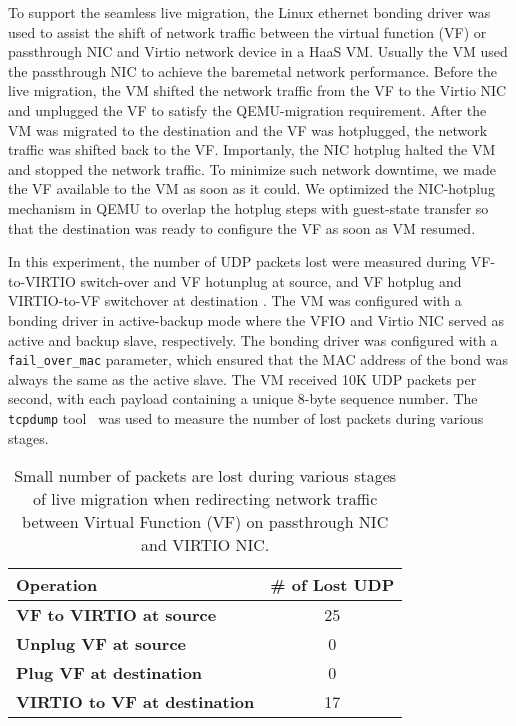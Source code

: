 

To support the seamless live migration, the Linux ethernet
bonding driver was used to assist the shift of network traffic
between the virtual function (VF) or passthrough NIC and
Virtio network device in a HaaS VM. Usually the VM used the
passthrough NIC to achieve the baremetal network performance.
Before the live migration, the VM shifted the network traffic
from the VF to the Virtio NIC and unplugged the VF to satisfy
the QEMU-migration requirement. After the VM was migrated to
the destination and the VF was hotplugged, the network traffic
was shifted back to the VF. Importanly, the NIC hotplug halted
the VM and stopped the network traffic. To minimize such
network downtime, we made the VF available to the VM as soon
as it could. We optimized the NIC-hotplug mechanism in QEMU
to overlap the hotplug steps with
guest-state transfer so that the destination was ready to
configure the VF as soon as VM resumed.

In this experiment, the number of UDP packets lost were measured
during VF-to-VIRTIO switch-over and VF hotunplug at source, and 
VF hotplug and VIRTIO-to-VF switchover at destination . The VM
was configured with a bonding driver in active-backup mode
where the VFIO and Virtio NIC served as active and backup
slave, respectively. The bonding driver was configured with a
\texttt{fail\_over\_mac} parameter, which ensured that the MAC
address of the bond was always the same as the active slave.
The VM received 10K UDP packets per second, with each payload
containing a unique 8-byte sequence number. 
The {\tt tcpdump} tool~\cite{tcpdump} was used to
measure the number of lost packets during various stages. 

\begin{table}[t]
\begin{center}
\begin{tabular}{|l|c|}
\hline
\textbf{Operation}    & \multicolumn{1}{l|}{\textbf{\# of Lost UDP}} \\ \hline
\textbf{VF to VIRTIO at source} & 25                                           \\ \hline
\textbf{Unplug VF at source}    & 0                                            \\ \hline
\textbf{Plug VF at destination}      & 0                                            \\ \hline
\textbf{VIRTIO to VF at destination} & 17                                           \\ \hline
\end{tabular}
\end{center}
\caption{Small number of packets are lost during various stages of 
live migration when redirecting 
network traffic between Virtual Function (VF) on passthrough NIC and VIRTIO NIC.
}
\label{tab:udp_packet_lost}
\end{table}

